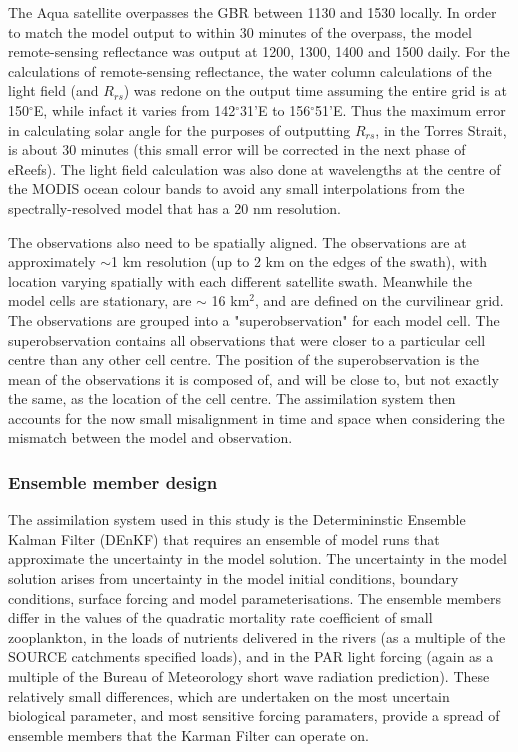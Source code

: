 \documentclass{elsart}
\begin{document}
The Aqua satellite overpasses the GBR between 1130 and 1530 locally. In order to match the model output to within 30 minutes of the overpass, the model remote-sensing reflectance was output at 1200, 1300, 1400 and 1500 daily. For the calculations of remote-sensing reflectance, the water column calculations of the light field (and $R_{rs}$) was redone on the output time assuming the entire grid is at 150$^{\circ}$E, while infact it varies from 142$^{\circ}$31'E to 156$^{\circ}$51'E. Thus the maximum error in calculating solar angle for the purposes of outputting $R_{rs}$, in the Torres Strait, is about 30 minutes (this small error will be corrected in the next phase of eReefs). The light field calculation was also done at wavelengths at the centre of the MODIS ocean colour bands to avoid any small interpolations from the spectrally-resolved model that has a 20 nm resolution.

The observations also need to be spatially aligned. The observations are at approximately $\sim$1 km resolution (up to 2 km on the edges of the swath), with location varying spatially with each different satellite swath. Meanwhile the model cells are stationary, are $\sim$ 16 km$^2$, and are defined on the curvilinear grid. The observations are grouped into a "superobservation" for each model cell. The superobservation contains all observations that were closer to a particular cell centre than any other cell centre. The position of the superobservation is the mean of the observations it is composed of, and will be close to, but not exactly the same, as the location of the cell centre. The assimilation system then accounts for the now small  misalignment in time and space when considering the mismatch between the model and observation.

\subsubsection{Ensemble member design} 

The assimilation system used in this study is the Determininstic Ensemble Kalman Filter (DEnKF) that requires an ensemble of model runs that approximate the uncertainty in the model solution.  The uncertainty in the model solution arises from uncertainty in the model initial conditions, boundary conditions, surface forcing and model parameterisations. 
The ensemble members differ in the values of the quadratic mortality rate coefficient of small zooplankton, in the loads of nutrients delivered in the rivers (as a multiple of the SOURCE catchments specified loads), and in the PAR light forcing (again as a multiple of the Bureau of Meteorology short wave radiation prediction). These relatively small differences, which are undertaken on the most uncertain biological parameter, and most sensitive forcing paramaters, provide a spread of ensemble members that the Karman Filter can operate on.
\end{document}
